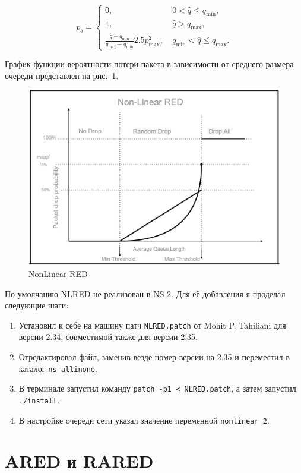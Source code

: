 \begin{equation}
\label{nlred}
p_{b} = \begin{cases}
        0, &  \ 0 < \hat{q} \leqslant q_{\min},
        \\
        1, &  \ \hat{q} > q_{\max},
        \\
        \frac{\hat{q} - q_{\min}}{q_{\max} - q_{\min}} {2.5p^{2}_{\max}}, & \ q_{\min} < \hat{q} \leqslant q_{\max}.
\end{cases}
\end{equation}

График функции вероятности потери пакета в зависимости от среднего
размера очереди представлен на  рис.~\ref{fig:2.4}.

\begin{figure}[!h]
  \centering
  \includegraphics[width=0.7\linewidth]{image/NonLinearRED.png}
  \caption{NonLinear RED}
  \label{fig:2.4}
\end{figure}

По умолчанию NLRED не реализован в NS-2. Для её добавления я проделал следующие шаги:

\begin{enumerate}
\item Установил к себе на машину патч \verb|NLRED.patch| от Mohit
  P. Tahiliani для версии 2.34, совместимой также для версии 2.35.
\item Отредактировал файл, заменив везде номер версии на 2.35 и
  переместил в каталог \verb|ns-allinone|.
\item В терминале запустил команду \verb|patch -p1 < NLRED.patch|, а
  затем запустил \verb|./install|.
\item В настройке очереди сети указал значение переменной \verb|nonlinear 2|.
\end{enumerate}
 
\section{ARED и RARED}

